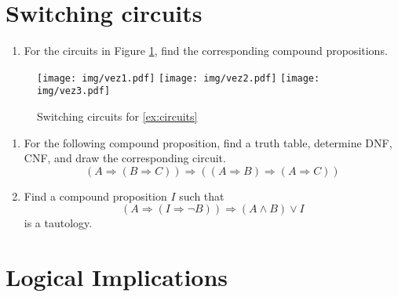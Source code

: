 \documentclass[11pt,paper=b5,footinclude,headinclude]{scrbook} %
\theoremstyle{remark}
\theoremstyle{definition} %
\theoremstyle{theorem} %
\begin{document}
\section{Switching circuits}
\begin{enumerate}[resume, label=\textbf{Problem \arabic*.}]
    \item For the circuits in Figure \ref{fig:circuits}, find the corresponding compound propositions.\label{ex:circuits}
\end{enumerate}

\begin{figure}
    \centering
    \texttt{[image: img/vez1.pdf]}
    \texttt{[image: img/vez2.pdf]}
    \texttt{[image: img/vez3.pdf]}
    \caption{Switching circuits for \ref{ex:circuits}}
    \label{fig:circuits}
\end{figure}



\begin{enumerate}[resume, label=\textbf{Problem \arabic*.}]
    \item For the following compound proposition, find a truth table, determine DNF, CNF, and draw the corresponding circuit.
\[
(A \Rightarrow (B \Rightarrow C)) \Rightarrow ((A \Rightarrow B) \Rightarrow (A \Rightarrow C))
\]
    \item Find a compound proposition $I$ such that
\[
(A \Rightarrow (I \Rightarrow \neg B)) \Rightarrow (A \land B) \lor I
\]
is a tautology.
\end{enumerate}


\section{Logical Implications}
\end{document}
